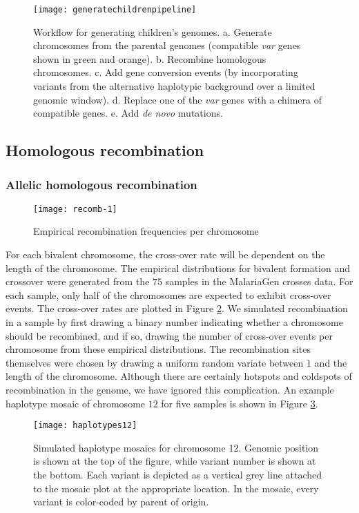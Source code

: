 \begin{figure}[h!]
  \centering
    \texttt{[image: generatechildrenpipeline]}
  \caption{Workflow for generating children's genomes.  a. Generate chromosomes from the parental genomes (compatible \textit{var} genes shown in green and orange).  b. Recombine homologous chromosomes.  c. Add gene conversion events (by incorporating variants from the alternative haplotypic background over a limited genomic window).  d. Replace one of the \textit{var} genes with a chimera of compatible genes.  e. Add \textit{de novo} mutations.}
  \label{fig:generatechildrenpipeline}
\end{figure}

\subsection{Homologous recombination}

\subsubsection{Allelic homologous recombination}

\begin{figure}[h!]
  \centering
    \texttt{[image: recomb-1]}
  \caption{Empirical recombination frequencies per chromosome}
  \label{fig:recomb-1}
\end{figure}

For each bivalent chromosome, the cross-over rate will be dependent on the length of the chromosome. The empirical distributions for bivalent formation and crossover were generated from the $75$ samples in the MalariaGen crosses data. For each sample, only half of the chromosomes are expected to exhibit cross-over events.  The cross-over rates are plotted in Figure \ref{fig:recomb-1}. We simulated recombination in a sample by first drawing a binary number indicating whether a chromosome should be recombined, and if so, drawing the number of cross-over events per chromosome from these empirical distributions. The recombination sites themselves were chosen by drawing a uniform random variate between $1$ and the length of the chromosome. Although there are certainly hotspots and coldspots of recombination in the genome, we have ignored this complication.  An example haplotype mosaic of chromosome $12$ for five samples is shown in Figure \ref{fig:haplotypes12}.

\begin{figure}[h!]
  \centering
    \texttt{[image: haplotypes12]}
  \caption{Simulated haplotype mosaics for chromosome 12.  Genomic position is shown at the top of the figure, while variant number is shown at the bottom.  Each variant is depicted as a vertical grey line attached to the mosaic plot at the appropriate location.  In the mosaic, every variant is color-coded by parent of origin.}
  \label{fig:haplotypes12}
\end{figure}

